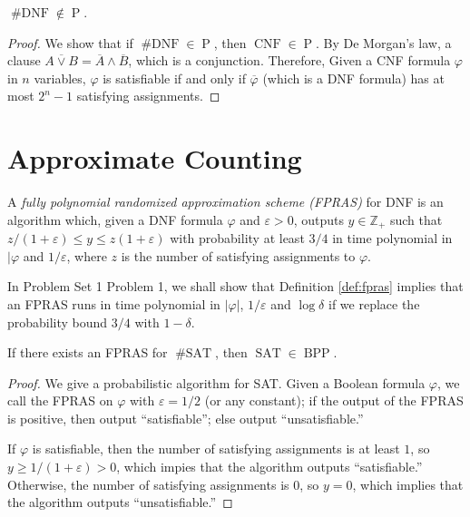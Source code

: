 \documentclass[letterpaper, reqno,11pt]{article}
\newcommand{\ZZ}{\mathbb{Z}}
\DeclareMathOperator{\shSAT}{\# SAT}
\DeclareMathOperator{\shDNF}{\# DNF}
\DeclareMathOperator{\Poly}{P}
\DeclareMathOperator{\CNF}{CNF}
\DeclareMathOperator{\SAT}{SAT}
\DeclareMathOperator{\BPP}{BPP}
\begin{document}
\begin{proposition}
  $\shDNF \not \in \Poly$.
\end{proposition}

\begin{proof}
  We show that if $\shDNF \in \Poly$, then $\CNF \in \Poly$. By De Morgan's law, a clause $\overline{A \vee B} = \overline{A} \wedge \overline{B}$, which is a conjunction. Therefore, Given a CNF formula $\varphi$ in $n$ variables, $\varphi$ is satisfiable if and only if $\overline \varphi$ (which is a DNF formula) has at most $2^n - 1$ satisfying assignments.
\end{proof}

\section{Approximate Counting}

\begin{definition} \label{def:fpras}
  A \emph{fully polynomial randomized approximation scheme (FPRAS)} for DNF is an algorithm which, given a DNF formula $\varphi$ and $\varepsilon > 0$, outputs $y \in \ZZ_+$ such that $z/(1 + \varepsilon) \leq y \leq z(1 + \varepsilon)$ with probability at least $3/4$ in time polynomial in $|\varphi$ and $1/\varepsilon$, where $z$ is the number of satisfying assignments to $\varphi$.
\end{definition}

In Problem Set 1 Problem 1, we shall show that Definition \ref{def:fpras} implies that an FPRAS runs in time polynomial in $|\varphi|$, $1/\varepsilon$ and $\log \delta$ if we replace the probability bound $3/4$ with $1 - \delta$.

\begin{proposition}
  If there exists an FPRAS for $\shSAT$, then $\SAT \in \BPP$.
\end{proposition}

\begin{proof}
  We give a probabilistic algorithm for SAT. Given a Boolean formula $\varphi$, we call the FPRAS on $\varphi$ with $\varepsilon = 1/2$ (or any constant); if the output of the FPRAS is positive, then output ``satisfiable''; else output ``unsatisfiable.''

  If $\varphi$ is satisfiable, then the number of satisfying assignments is at least $1$, so $y \geq 1/(1 + \varepsilon) > 0$, which impies that the algorithm outputs ``satisfiable.'' Otherwise, the number of satisfying assignments is $0$, so $y = 0$, which implies that the algorithm outputs ``unsatisfiable.''
\end{proof}
\end{document}

